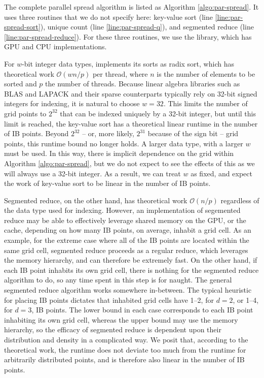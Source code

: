 The complete parallel spread algorithm is listed as Algorithm
\ref{algo:par-spread}. It uses three routines that we do not specify here:
key-value sort (line \ref{line:par-spread-sort}), unique count (line
\ref{line:par-spread-q}), and segmented reduce (line
\ref{line:par-spread-reduce}). For these three routines, we use the {\thrust}
library, which has GPU and CPU implementations.

For $w$-bit integer data types, {\thrust} implements its sorts as radix
sort, which has theoretical work $\mathcal{O}(w n / p)$ per thread, where $n$
is the number of elements to be sorted and $p$ the number of threads. Because
linear algebra libraries such as BLAS and LAPACK and their sparse counterparts
typically rely on 32-bit signed integers for indexing, it is natural to choose
$w = 32$. This limits the number of grid points to $2^{32}$ that can be indexed
uniquely by a 32-bit integer, but until this limit is reached, the key-value
sort has a theoretical linear runtime in the number of IB points. Beyond
$2^{32}$ -- or, more likely, $2^{31}$ because of the sign bit -- grid points,
this runtime bound no longer holds. A larger data type, with a larger $w$ must
be used. In this way, there is implicit dependence on the grid within Algorithm
\ref{algo:par-spread}, but we do not expect to see the effects of this as we
will always use a 32-bit integer. As a result, we can treat $w$ as fixed, and
expect the work of key-value sort to be linear in the number of IB points.

Segmented reduce, on the other hand, has theoretical work $\mathcal{O}(n / p)$
regardless of the data type used for indexing. However, an implementation of
segemented reduce may be able to effectively leverage shared memory on the GPU,
or the cache, depending on how many IB points, on average, inhabit a grid cell.
As an example, for the extreme case where all of the IB points are located
within the same grid cell, segmented reduce proceeds as a regular reduce, which
leverages the memory hierarchy, and can therefore be extremely fast. On the
other hand, if each IB point inhabits its own grid cell, there is nothing for
the segmented reduce algorithm to do, so any time spent in this step is for
naught. The general segmented reduce algorithm works somewhere in-between. The
typical heuristic for placing IB points dictates that inhabited grid cells have
1--2, for $d=2$, or 1--4, for $d=3$, IB points. The lower bound in each case
corresponds to each IB point inhabiting its own grid cell, whereas the upper
bound may use the memory hierarchy, so the efficacy of segmented reduce is
dependent upon their distribution and density in a complicated way. We posit
that, according to the theoretical work, the runtime does not deviate too much
from the runtime for arbitrarily distributed points, and is therefore also
linear in the number of IB points.

